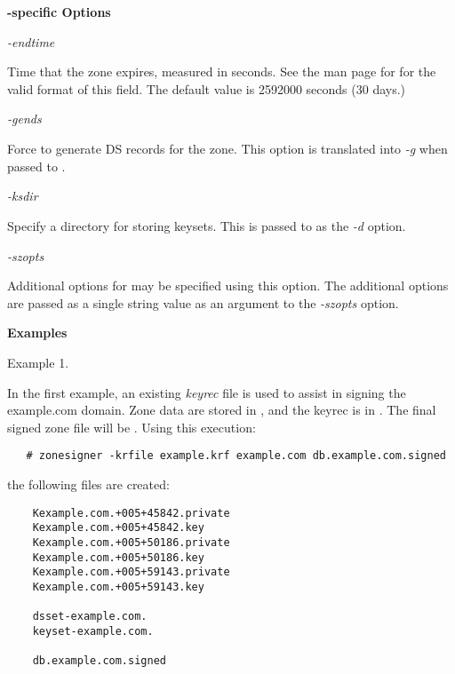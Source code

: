 {\bf {}-specific Options}

\begin{description}

\item {\it -endtime}\verb" "

Time that the zone expires, measured in seconds.  See the man page for
 for the valid format of this field.
The default value is 2592000 seconds (30 days.)

\item {\it -gends}\verb" "

Force  to generate DS records for the zone.  This option
is translated into {\it -g} when passed to .

\item {\it -ksdir}\verb" "

Specify a directory for storing keysets.  This is passed to
 as the {\it -d} option.

\item {\it -szopts}\verb" "

Additional options for  may be specified using this
option.  The additional options are passed as a single string value as an
argument to the {\it -szopts} option.

\end{description}

{\bf Examples}

Example 1.

In the first example, an existing {\it keyrec} file is used to assist in
signing the example.com domain.  Zone data are stored in ,
and the keyrec is in .  The final signed zone file will be
.  Using this execution:

\begin{verbatim}
   # zonesigner -krfile example.krf example.com db.example.com.signed
\end{verbatim}

the following files are created:

\begin{verbatim}
    Kexample.com.+005+45842.private
    Kexample.com.+005+45842.key
    Kexample.com.+005+50186.private
    Kexample.com.+005+50186.key
    Kexample.com.+005+59143.private
    Kexample.com.+005+59143.key

    dsset-example.com.
    keyset-example.com.

    db.example.com.signed
\end{verbatim}

